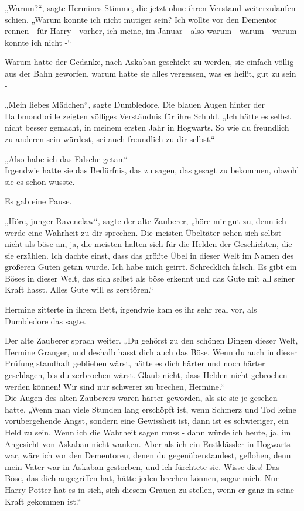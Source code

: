 {„Warum?“, sagte Hermines Stimme, die jetzt ohne ihren Verstand weiterzulaufen schien. „Warum konnte ich nicht mutiger sein? Ich wollte vor den Dementor rennen - für Harry - vorher, ich meine, im Januar - also warum - warum - warum konnte ich nicht -“

Warum hatte der Gedanke, nach Askaban geschickt zu werden, sie einfach völlig aus der Bahn geworfen, warum hatte sie alles vergessen, was es heißt, gut zu sein -

„Mein liebes Mädchen“, sagte Dumbledore. Die blauen Augen hinter der Halbmondbrille zeigten völliges Verständnis für ihre Schuld. „Ich hätte es selbst nicht besser gemacht, in meinem ersten Jahr in Hogwarts. So wie du freundlich zu anderen sein würdest, sei auch freundlich zu dir selbst.“

„Also habe ich das Falsche getan.“\\ Irgendwie hatte sie das Bedürfnis, das zu sagen, das gesagt zu bekommen, obwohl sie es schon wusste.

Es gab eine Pause.

„Höre, junger Ravenclaw“, sagte der alte Zauberer, „höre mir gut zu, denn ich werde eine Wahrheit zu dir sprechen. Die meisten Übeltäter sehen sich selbst nicht als böse an, ja, die meisten halten sich für die Helden der Geschichten, die sie erzählen. Ich dachte einst, dass das größte Übel in dieser Welt im Namen des größeren Guten getan wurde. Ich habe mich geirrt. Schrecklich falsch. Es gibt ein Böses in dieser Welt, das sich selbst als böse erkennt und das Gute mit all seiner Kraft hasst. Alles Gute will es zerstören.“

Hermine zitterte in ihrem Bett, irgendwie kam es ihr sehr real vor, als Dumbledore das sagte.

Der alte Zauberer sprach weiter. „Du gehörst zu den schönen Dingen dieser Welt, Hermine Granger, und deshalb hasst dich auch das Böse. Wenn du auch in dieser Prüfung standhaft geblieben wärst, hätte es dich härter und noch härter geschlagen, bis du zerbrochen wärst. Glaub nicht, dass Helden nicht gebrochen werden können! Wir sind nur schwerer zu brechen, Hermine.“\\ Die Augen des alten Zauberers waren härter geworden, als sie sie je gesehen hatte. „Wenn man viele Stunden lang erschöpft ist, wenn Schmerz und Tod keine vorübergehende Angst, sondern eine Gewissheit ist, dann ist es schwieriger, ein Held zu sein. Wenn ich die Wahrheit sagen muss - dann würde ich heute, ja, im Angesicht von Askaban nicht wanken. Aber als ich ein Erstklässler in Hogwarts war, wäre ich vor den Dementoren, denen du gegenüberstandest, geflohen, denn mein Vater war in Askaban gestorben, und ich fürchtete sie. Wisse dies! Das Böse, das dich angegriffen hat, hätte jeden brechen können, sogar mich. Nur Harry Potter hat es in sich, sich diesem Grauen zu stellen, wenn er ganz in seine Kraft gekommen ist.“

}
